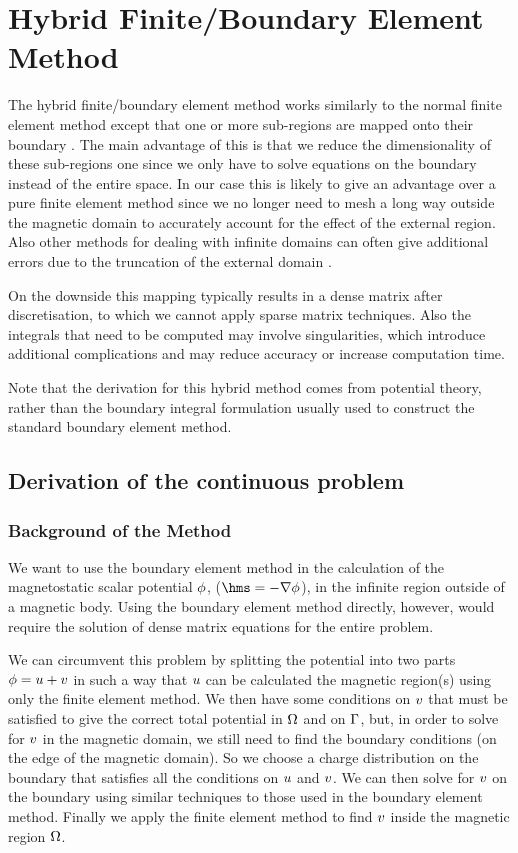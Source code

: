 
\chapter{Hybrid Finite/Boundary Element Method}
\label{sec:hybr-finit-elem}
The hybrid finite/boundary element method works similarly to the normal finite element method except that one or more sub-regions are mapped onto their boundary \cite{Rammohan2002}.
The main advantage of this is that we reduce the dimensionality of these sub-regions one since we only have to solve equations on the boundary instead of the entire space.
In our case this is likely to give an advantage over a pure finite element method since we no longer need to mesh a long way outside the magnetic domain to accurately account for the effect of the external region.
Also other methods for dealing with infinite domains can often give additional errors due to the truncation of the external domain \cite{Bottauscio2008}.

On the downside this mapping typically results in a dense matrix after discretisation, to which we cannot apply sparse matrix techniques.
Also the integrals that need to be computed may involve singularities, which introduce additional complications and may reduce accuracy or increase computation time.

Note that the derivation for this hybrid method comes from potential theory, rather than the boundary integral formulation usually used to construct the standard boundary element method.

\section{Derivation of the continuous problem}
\label{sec:bem-derivation}

\subsection{Background of the Method}
\label{sec:basic-method}
We want to use the boundary element method in the calculation of the magnetostatic scalar potential $\phi$, ($\hms = - \nabla \phim$), in the infinite region outside of a magnetic body.
Using the boundary element method directly, however, would require the solution of dense matrix equations for the entire problem.

We can circumvent this problem by splitting the potential into two parts $\phi = u + v$ in such a way that $u$ can be calculated the magnetic region(s) using only the finite element method.
We then have some conditions on $v$ that must be satisfied to give the correct total potential in $\Omega$ and on ${\Gamma}$, but, in order to solve for $v$ in the magnetic domain, we still need to find the boundary conditions (on the edge of the magnetic domain).
So we choose a charge distribution on the boundary that satisfies all the conditions on $u$ and $v$.
We can then solve for $v$ on the boundary using similar techniques to those used in the boundary element method.
Finally we apply the finite element method to find $v$ inside the magnetic region $\Omega$.

